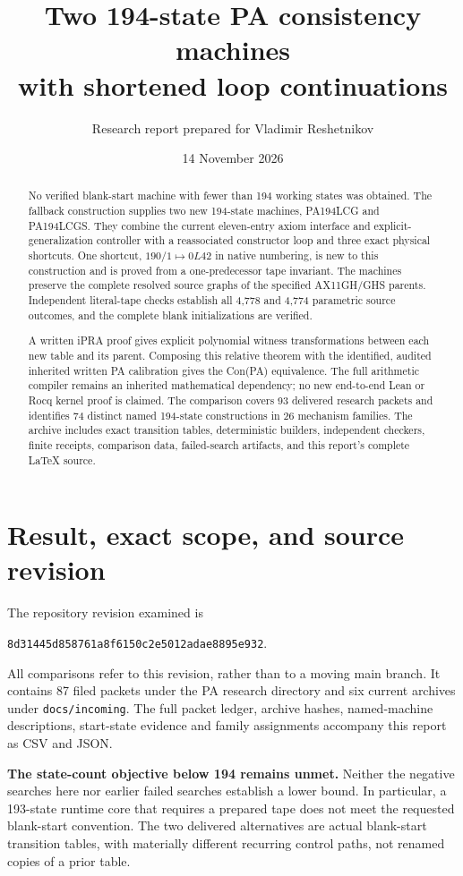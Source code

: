 \documentclass[11pt,letterpaper]{article}
\title{\color{ink}Two 194-state PA consistency machines\\with shortened loop continuations}
\author{Research report prepared for Vladimir Reshetnikov}
\date{14 November 2026}
\newcommand{\file}[1]{\nolinkurl{#1}}
\begin{document}
\maketitle
\begin{abstract}
No verified blank-start machine with fewer than 194 working states was
obtained. The fallback construction supplies two new 194-state machines,
PA194LCG and PA194LCGS. They combine the current eleven-entry axiom
interface and explicit-generalization controller with a reassociated
constructor loop and three exact physical shortcuts. One shortcut,
$190/1\mapsto0L42$ in native numbering, is new to this construction and is
proved from a one-predecessor tape invariant. The machines preserve the
complete resolved source graphs of the specified AX11GH/GHS parents.
Independent literal-tape checks establish all 4,778 and 4,774 parametric
source outcomes, and the complete blank initializations are verified.

A written iPRA proof gives explicit polynomial witness transformations
between each new table and its parent. Composing this relative theorem
with the identified, audited inherited written PA calibration gives the
Con(PA) equivalence. The full arithmetic compiler remains an inherited
mathematical dependency; no new end-to-end Lean or Rocq kernel proof is
claimed. The comparison covers 93 delivered research packets and identifies
74 distinct named 194-state constructions in 26 mechanism families.
The archive includes exact transition tables, deterministic builders,
independent checkers, finite receipts, comparison data, failed-search
artifacts, and this report's complete LaTeX source.
\end{abstract}

\section{Result, exact scope, and source revision}
\label{sec:result}
The repository revision examined is
\begin{center}\small
\nolinkurl{8d31445d858761a8f6150c2e5012adae8895e932}.
\end{center}
All comparisons refer to this revision, rather than to a moving main
branch. It contains 87 filed packets under the PA research directory and
six current archives under \file{docs/incoming}. The full packet ledger,
archive hashes, named-machine descriptions, start-state evidence and
family assignments accompany this report as CSV and JSON.

\textbf{The state-count objective below 194 remains unmet.} Neither the
negative searches here nor earlier failed searches establish a lower bound.
In particular, a 193-state runtime core that requires a prepared tape does
not meet the requested blank-start convention. The two delivered alternatives
are actual blank-start transition tables, with materially different
recurring control paths, not renamed copies of a prior table.
\end{document}
